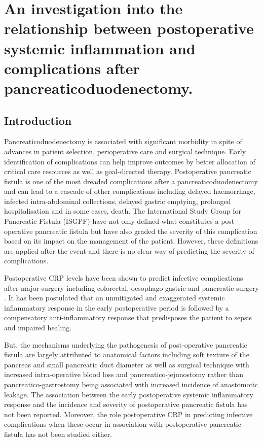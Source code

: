 
\chapter{An investigation into the relationship between postoperative systemic inflammation and complications after pancreaticoduodenectomy.}
\label{ch_crp_comp}


\clearpage
\section{Introduction}
Pancreaticoduodenectomy is associated with significant morbidity in spite of advances in patient selection, perioperative care and surgical technique. 
Early identification of complications can help improve outcomes by better allocation of critical care resources as well as goal-directed therapy. 
Postoperative pancreatic fistula is one of the most dreaded complications after a pancreaticoduodenectomy and can lead to a cascade of other complications including delayed haemorrhage, infected intra-abdominal collections, delayed gastric emptying, prolonged hospitalisation and in some cases, death. 
The International Study Group for Pancreatic Fistula (ISGPF) have not only defined what constitutes a post-operative pancreatic fistula but have also graded the severity of this complication based on its impact on the management of the patient. 
However, these definitions are applied after the event and there is no clear way of predicting the severity of complications.

Postoperative CRP levels have been shown to predict infective complications after major surgery including colorectal,  oesophago-gastric and pancreatic surgery \parencite{mustard_c-reactive_1987, matthiessen_increase_2008, mcneer_early_2010, dutta_persistent_2011, mackay_c-reactive_2011, murakami_soft_2008, welsch_persisting_2008}. 
It has been postulated that an unmitigated and exaggerated systemic inflammatory response in the early postoperative period is followed by a compensatory anti-inflammatory response that predisposes the patient to sepsis and impaired healing. 

But, the mechanisms underlying the pathogenesis of post-operative pancreatic fistula are largely attributed to anatomical factors including soft texture of the pancreas and small pancreatic duct diameter as well as surgical technique with increased intra-operative blood loss and pancreatico-jejunostomy rather than pancreatico-gastrostomy being associated with increased incidence of anastomotic leakage. 
The association between the early postoperative systemic inflammatory response and the incidence and severity of postoperative pancreatic fistula has not been reported. 
Moreover, the role postoperative CRP in predicting infective complications when these occur in association with postoperative pancreatic fistula has not been studied either. 

